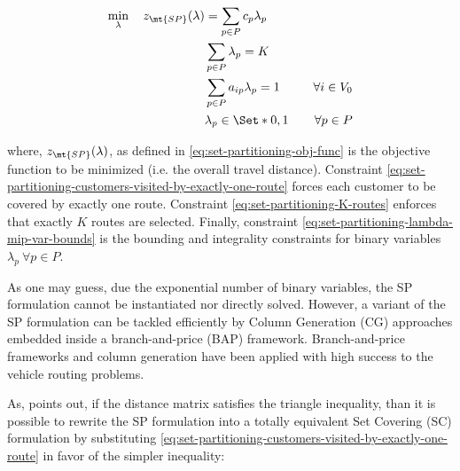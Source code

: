 \begin{align}
	\min_{\lambda} \quad z_\mt{SP}(\lambda) & = \sum_{p \in P}  c_p \lambda_p \label{eq:set-partitioning-obj-func}                                                                                                                                           \\
	                                        & \sum_{p \in P} \lambda_{p} = K\label{eq:set-partitioning-K-routes}                                                                                                                                             \\
	                                        & \sum_{p \in P}  a_{ip} \lambda_p = 1                                 & \quad \forall i \in V_0                                              \label{eq:set-partitioning-customers-visited-by-exactly-one-route} \\
	                                        & \lambda_p                    \in \Set*{0, 1}                         & \quad \forall p \in P \label{eq:set-partitioning-lambda-mip-var-bounds}
\end{align}

where, $z_\mt{SP}(\lambda)$, as defined in \eqref{eq:set-partitioning-obj-func} is the objective function to be minimized (i.e. the overall travel distance).
Constraint \eqref{eq:set-partitioning-customers-visited-by-exactly-one-route} forces each customer to be covered by exactly one route.
Constraint \eqref{eq:set-partitioning-K-routes} enforces that exactly $K$ routes are selected.
Finally, constraint \eqref{eq:set-partitioning-lambda-mip-var-bounds} is the bounding and integrality constraints for binary variables $\lambda_p \ \forall p \in P$.

As one may guess,
due the exponential number of binary variables,
the SP formulation cannot be instantiated nor directly solved.
However,
a variant of the SP formulation can be tackled efficiently by Column Generation (CG) approaches
embedded inside a branch-and-price (BAP) framework.
Branch-and-price frameworks and column generation have been applied
with high success to the vehicle routing problems.


As, \textcite{toth2002} points out, if the distance matrix satisfies the triangle inequality,
than it is possible to rewrite the SP formulation into a totally equivalent Set Covering (SC) formulation
by substituting \cref{eq:set-partitioning-customers-visited-by-exactly-one-route} in favor of the simpler inequality:

